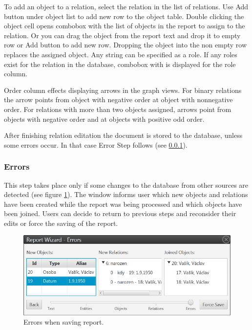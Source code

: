 To add an object to a relation, select the relation in the list of relations.
Use Add button under object list to add new row to the object table. Double
clicking the object cell opens combobox with the list of objects in the report
to assign to the relation. Or you can drag the object from the report text and
drop it to empty row or Add button to add new row. Dropping the object into the
non empty row replaces the assigned object. Any string can be specified as
a role. If any roles exist for the relation in the database, combobox with
is displayed for the role column.

Order column effects displaying arrows in the graph views. For binary
relations the arrow points from object with negative order at object with
nonnegative order. For relations with more than two objects assigned, arrows
point from objects with negative order and at objects with positive odd order.

After finishing relation editation the document is stored to the database,
unless some errors occur. In that case Error Step follows (see
\ref{sssec:Errors}).

\subsubsection{Errors}
\label{sssec:Errors}

This step takes place only if some changes to the database from other sources
are detected (see figure \ref{fig:Errors}). The window informs user which new
objects and relations have been created while the report was being processed and
which objects have been joined. Users can decide to return to previous steps
and reconsider their edits or force the saving of the report.

\begin{figure}[!htb]
        \centering
        \includegraphics[width=\textwidth]{Images/errors}
        \caption{Errors when saving report.}
        \label{fig:Errors}
\end{figure}

